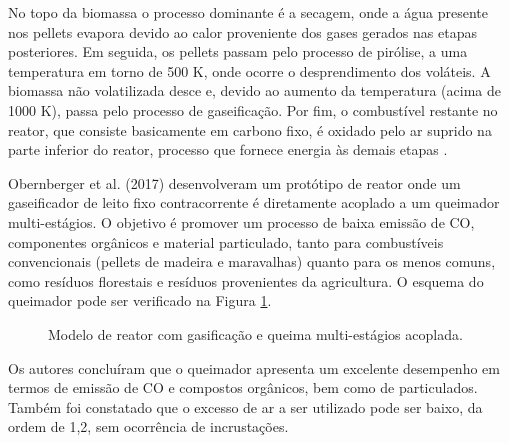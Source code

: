 No topo da biomassa o processo dominante é a secagem, onde a água presente nos pellets evapora devido ao calor proveniente dos gases gerados nas etapas posteriores. Em seguida, os pellets passam pelo processo de pirólise, a uma temperatura em torno de 500 K, onde ocorre o desprendimento dos voláteis. A biomassa não volatilizada desce e, devido ao aumento da temperatura (acima de 1000 K), passa pelo processo de gaseificação. Por fim, o combustível restante no reator, que consiste basicamente em carbono fixo, é oxidado pelo ar suprido na parte inferior do reator, processo que fornece energia às demais etapas \cite{Mandl2010}.

Obernberger et al. (2017) desenvolveram um protótipo de reator onde um gaseificador de leito fixo contracorrente é diretamente acoplado a um queimador multi-estágios. O objetivo é promover um processo de baixa emissão de CO, componentes orgânicos e material particulado, tanto para combustíveis convencionais (pellets de madeira e maravalhas) quanto para os menos comuns, como resíduos florestais e resíduos provenientes da agricultura. O esquema do queimador pode ser verificado na Figura \ref{fig:obernberger}.

\begin{figure}[!ht]
	\centering
	\caption{Modelo de reator com gasificação e queima multi-estágios acoplada.}
	\label{fig:obernberger}
\end{figure}

\noindent Os autores concluíram que o queimador apresenta um excelente desempenho em termos de emissão de CO e compostos orgânicos, bem como de particulados. Também foi constatado que o excesso de ar a ser utilizado pode ser baixo, da ordem de 1,2, sem ocorrência de incrustações.

